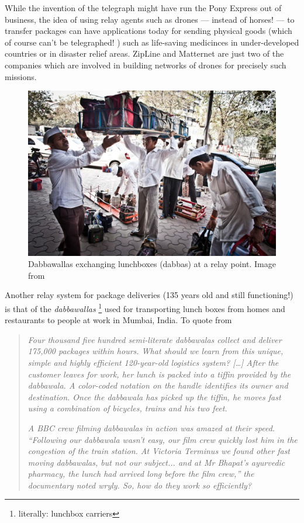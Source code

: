 \documentclass[12pt, english, oneside]{report}
\begin{document}
\begin{appendices}
While the invention of the telegraph might have run the Pony Express out of business, the idea of using relay agents 
such as drones --- instead of horses! --- to transfer packages can have applications today for sending physical goods 
(which of course can't be telegraphed! \Winkey) such as  life-saving medicinces in under-developed 
countries or in disaster relief areas. 
ZipLine\cite{zipline} \cite{zipline-ted} and Matternet \cite{matternet} are just two of the companies which 
are involved in building networks of drones for precisely such missions.

\begin{figure}[H]
  \centering
  \includegraphics[width=12cm]{docs/dabba.jpg}
  \caption{Dabbawallas exchanging lunchboxes (dabbas) at a relay point. Image from \cite{Magazine2019Oct} }
\end{figure}


Another relay system for package deliveries (135 years old and still functioning!) is that of 
the \textit{dabbawallas} \footnote{literally: lunchbox carriers} used for transporting lunch boxes from 
homes and restaurants to people at work in Mumbai, India. To quote from \cite{dabba}
\begin{quote}
\textit{Four thousand five hundred semi-literate dabbawalas collect and deliver 175,000 packages 
within hours. What should we learn from this unique, simple and highly efficient 120-year-old 
logistics system? [\ldots] After the customer leaves for work, her lunch is packed into a tiffin 
provided by the dabbawala. A color-coded notation on the handle identifies its owner and destination. 
Once the dabbawala has picked up the tiffin, he moves fast using a combination of bicycles, trains and his 
two feet.}

\textit{A BBC crew filming dabbawalas in action was amazed at their speed. ``Following our dabbawala 
wasn't easy, our film crew quickly lost him in the congestion of the train station. At Victoria 
Terminus we found other fast moving dabbawalas, but not our subject... and at Mr Bhapat's ayurvedic 
pharmacy, the lunch had arrived long before the film crew,'' the documentary noted wryly. So, how do 
they work so efficiently?}


\end{quote}
\end{appendices}
\end{document}
